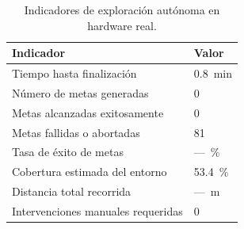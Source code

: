 \begin{table}[H]
\centering
\caption{Indicadores de exploración autónoma en hardware real.}
\label{tab:explore_real}
\begin{tabular}{ll}
\hline
\textbf{Indicador} & \textbf{Valor} \\
\hline
Tiempo hasta finalización          & 0.8~min \\
Número de metas generadas          & 0 \\
Metas alcanzadas exitosamente      & 0 \\
Metas fallidas o abortadas         & 81 \\
Tasa de éxito de metas             & ---~\% \\
Cobertura estimada del entorno     & 53.4~\% \\
Distancia total recorrida          & ---~m \\
Intervenciones manuales requeridas & 0 \\
\hline
\end{tabular}
\end{table}

